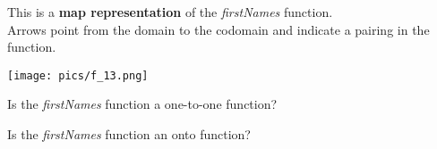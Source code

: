 \documentclass{ximera}
\begin{document}
\begin{exercise}


This is a \textbf{map representation} of the \textit{firstNames} function. \\

Arrows point from the domain to the codomain and indicate a pairing in the function.

\begin{image}
\texttt{[image: pics/f\_13.png]}
\end{image}


\begin{question}
Is the \textit{firstNames} function a one-to-one function?

\begin{multipleChoice}
\end{multipleChoice}
\end{question}






\begin{question}
Is the \textit{firstNames} function an onto function?

\begin{multipleChoice}
\end{multipleChoice}
\end{question}


\end{exercise}
\end{document}
